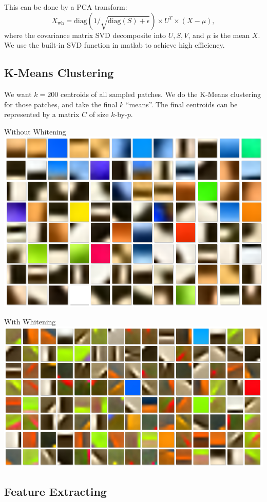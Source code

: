 \documentclass{acm_proc_article-sp}
\begin{document}
This can be done by a PCA transform:
\begin{equation}
        X_{\text{wh}}=\text{diag}\left(1/\sqrt{\text{diag}(S)+\epsilon}\right)\times U^T
        \times (X-\mu),
\end{equation}
where the covariance matrix SVD decomposite into $U,S,V$, and $\mu$ is the mean
$X$. We use the built-in SVD function in matlab to achieve high efficiency.

\subsection{K-Means Clustering}

We want $k=200$ centroids of all sampled patches.
We do the K-Means clustering for those patches,
    and take the final $k$ ``means''.
The final centroids can be represented by a matrix $C$ of size $k$-by-$p$.


\begin{center}
        Without Whitening
        \includegraphics[width=0.8\linewidth]{004.png}

        With Whitening
        \includegraphics[width=0.8\linewidth]{005.png}
\end{center}

\subsection{Feature Extracting}
\end{document}
